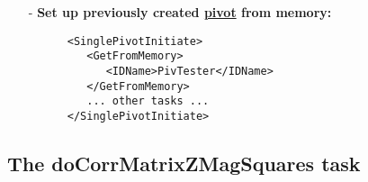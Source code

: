 \documentclass[12pt]{article}
\begin{document}
\begin{itemize}
\item[-] \textbf{Set up previously created \underline{pivot} from memory:}
\begin{verbatim}
      <SinglePivotInitiate>                                                      
         <GetFromMemory>                                                         
            <IDName>PivTester</IDName>                                           
         </GetFromMemory>                                                        
         ... other tasks ...                                                     
      </SinglePivotInitiate>                                                     
\end{verbatim}
\end{itemize}

\subsection{The doCorrMatrixZMagSquares task}
\end{document}
